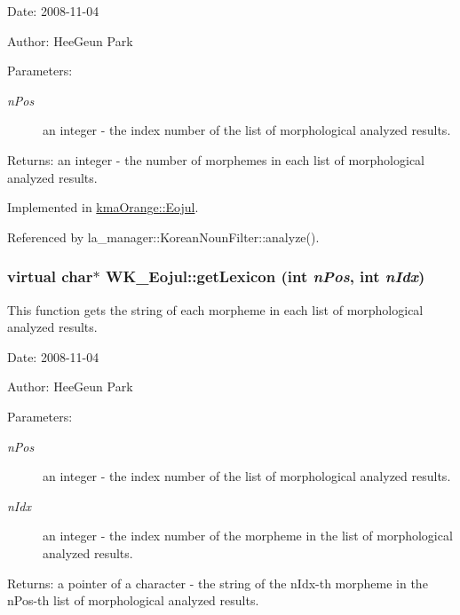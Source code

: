 \begin{Desc}
\item[Date:]2008-11-04 \end{Desc}
\begin{Desc}
\item[Author:]HeeGeun Park \end{Desc}
\begin{Desc}
\item[Parameters:]
\begin{description}
\item[{\em nPos}]an integer - the index number of the list of morphological analyzed results. \end{description}
\end{Desc}
\begin{Desc}
\item[Returns:]an integer - the number of morphemes in each list of morphological analyzed results. \end{Desc}


Implemented in \hyperlink{classkmaOrange_1_1Eojul_e0f30e4becfe50ed6208b8079f08e51a}{kmaOrange::Eojul}.

Referenced by la\_\-manager::KoreanNounFilter::analyze().\hypertarget{classWK__Eojul_d0799c16981e56643926838c91ad2be7}{
\subsubsection[{getLexicon}]{\setlength{\rightskip}{0pt plus 5cm}virtual char$\ast$ WK\_\-Eojul::getLexicon (int {\em nPos}, \/  int {\em nIdx})}}
\label{classWK__Eojul_d0799c16981e56643926838c91ad2be7}


This function gets the string of each morpheme in each list of morphological analyzed results. 

\begin{Desc}
\item[Date:]2008-11-04 \end{Desc}
\begin{Desc}
\item[Author:]HeeGeun Park \end{Desc}
\begin{Desc}
\item[Parameters:]
\begin{description}
\item[{\em nPos}]an integer - the index number of the list of morphological analyzed results. \item[{\em nIdx}]an integer - the index number of the morpheme in the list of morphological analyzed results. \end{description}
\end{Desc}
\begin{Desc}
\item[Returns:]a pointer of a character - the string of the nIdx-th morpheme in the nPos-th list of morphological analyzed results. \end{Desc}


